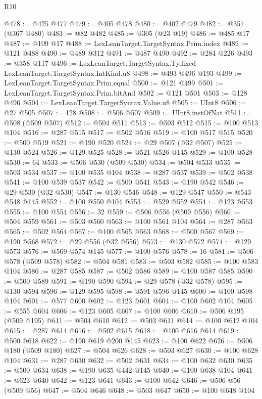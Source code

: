 \begin{lexlean}{R10}
\begin{coremodule}
@478 := @425 @477
@479 := @405 @478
@480 := @402 @479
@482 := @357 (@367 @480)
@483 := @82 @482
@485 := @305 (@23 @19)
@486 := @485 @17
@487 := @109 @17
@488 := LexLeanTarget.TargetSyntax.Prim.index
@489 := @121 @488
@490 := @489 @312
@491 := @487 @490
@492 := @284 @226
@493 := @358 @117
@496 := LexLeanTarget.TargetSyntax.Ty.fixed LexLeanTarget.TargetSyntax.IntKind.u8
@498 := @493 @496 @193
@499 := LexLeanTarget.TargetSyntax.Prim.equal
@500 := @121 @499
@501 := LexLeanTarget.TargetSyntax.Prim.bitAnd
@502 := @121 @501
@503 := @128 @496
@504 := LexLeanTarget.TargetSyntax.Value.u8
@505 := UInt8
@506 := @27 @505
@507 := 128
@508 := @506 @507
@509 := UInt8.instOfNat
@511 := @508 (@509 @507)
@512 := @504 @511
@513 := @503 @512
@515 := @100 @513 @104
@516 := @287 @515
@517 := @502 @516
@519 := @100 @517 @515
@520 := @500 @519
@521 := @190 @520
@524 := @29 @507 (@32 @507)
@525 := @130 @524
@526 := @129 @525
@528 := @521 @526 @145
@529 := @100 @528
@530 := 64
@533 := @506 @530 (@509 @530)
@534 := @504 @533
@535 := @503 @534
@537 := @100 @535 @104
@538 := @287 @537
@539 := @502 @538
@541 := @100 @539 @537
@542 := @500 @541
@543 := @190 @542
@546 := @29 @530 (@32 @530)
@547 := @130 @546
@548 := @129 @547
@550 := @543 @548 @145
@552 := @100 @550 @104
@553 := @529 @552
@554 := @123 @553
@555 := @100 @554
@556 := 32
@559 := @506 @556 (@509 @556)
@560 := @504 @559
@561 := @503 @560
@563 := @100 @561 @104
@564 := @287 @563
@565 := @502 @564
@567 := @100 @565 @563
@568 := @500 @567
@569 := @190 @568
@572 := @29 @556 (@32 @556)
@573 := @130 @572
@574 := @129 @573
@576 := @569 @574 @145
@577 := @100 @576
@578 := 16
@581 := @506 @578 (@509 @578)
@582 := @504 @581
@583 := @503 @582
@585 := @100 @583 @104
@586 := @287 @585
@587 := @502 @586
@589 := @100 @587 @585
@590 := @500 @589
@591 := @190 @590
@594 := @29 @578 (@32 @578)
@595 := @130 @594
@596 := @129 @595
@598 := @591 @596 @145
@600 := @100 @598 @104
@601 := @577 @600
@602 := @123 @601
@604 := @100 @602 @104
@605 := @555 @604
@606 := @123 @605
@607 := @100 @606
@610 := @506 @195 (@509 @195)
@611 := @504 @610
@612 := @503 @611
@614 := @100 @612 @104
@615 := @287 @614
@616 := @502 @615
@618 := @100 @616 @614
@619 := @500 @618
@622 := @190 @619 @200 @145
@623 := @100 @622
@626 := @506 @180 (@509 @180)
@627 := @504 @626
@628 := @503 @627
@630 := @100 @628 @104
@631 := @287 @630
@632 := @502 @631
@634 := @100 @632 @630
@635 := @500 @634
@638 := @190 @635 @442 @145
@640 := @100 @638 @104
@641 := @623 @640
@642 := @123 @641
@643 := @100 @642
@646 := @506 @56 (@509 @56)
@647 := @504 @646
@648 := @503 @647
@650 := @100 @648 @104

\end{coremodule}
\end{lexlean}
